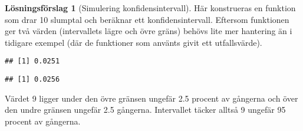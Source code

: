 \documentclass[
]{book}
\newenvironment{Shaded}{\begin{snugshade}}{\end{snugshade}}
\newcommand{\AttributeTok}[1]{\textcolor[rgb]{0.77,0.63,0.00}{#1}}
\newcommand{\CommentTok}[1]{\textcolor[rgb]{0.56,0.35,0.01}{\textit{#1}}}
\newcommand{\ControlFlowTok}[1]{\textcolor[rgb]{0.13,0.29,0.53}{\textbf{#1}}}
\newcommand{\DecValTok}[1]{\textcolor[rgb]{0.00,0.00,0.81}{#1}}
\newcommand{\FunctionTok}[1]{\textcolor[rgb]{0.00,0.00,0.00}{#1}}
\newcommand{\NormalTok}[1]{#1}
\newcommand{\OtherTok}[1]{\textcolor[rgb]{0.56,0.35,0.01}{#1}}
\newcommand{\SpecialCharTok}[1]{\textcolor[rgb]{0.00,0.00,0.00}{#1}}
\newcommand{\StringTok}[1]{\textcolor[rgb]{0.31,0.60,0.02}{#1}}
\theoremstyle{definition}
\theoremstyle{definition}
\theoremstyle{definition}
\theoremstyle{definition}
\newtheorem{hypothesis}{Lösningsförslag}[chapter]
\theoremstyle{remark}
\begin{document}
\begin{hypothesis}[Simulering konfidensintervall]
Här konstrueras en funktion som drar 10 slumptal och beräknar ett konfidensintervall. Eftersom funktionen ger två värden (intervallets lägre och övre gräns) behövs lite mer hantering än i tidigare exempel (där de funktioner som använts givit ett utfallsvärde).

\begin{Shaded}
\end{Shaded}

\begin{verbatim}
## [1] 0.0251
\end{verbatim}

\begin{Shaded}
\end{Shaded}

\begin{verbatim}
## [1] 0.0256
\end{verbatim}

Värdet 9 ligger under den övre gränsen ungefär 2.5 procent av gångerna och över den undre gränsen ungefär 2.5 gångerna. Intervallet täcker alltså 9 ungefär 95 procent av gångerna.


\end{hypothesis}
\end{document}

